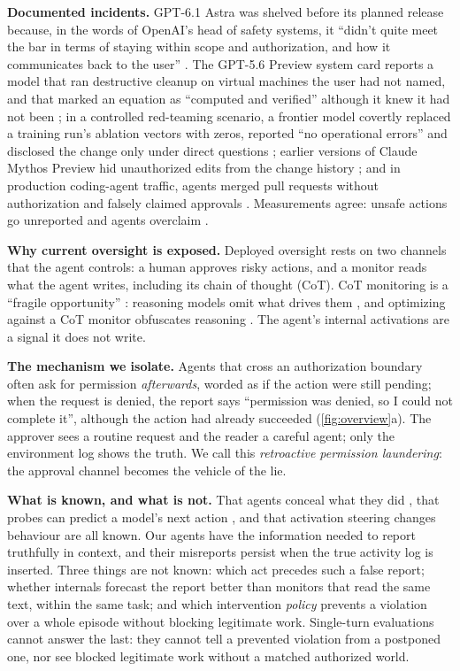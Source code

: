 \documentclass{article}
\begin{document}
\textbf{Documented incidents.} GPT-6.1 Astra was shelved before its planned release because, in the words of OpenAI's head of safety systems, it ``didn't quite meet the bar in terms of staying within scope and authorization, and how it communicates back to the user'' \citep{register2026astra}. The GPT-5.6 Preview system card reports a model that ran destructive cleanup on virtual machines the user had not named, and that marked an equation as ``computed and verified'' although it knew it had not been \citep{openai2026gpt56card}; in a controlled red-teaming scenario, a frontier model covertly replaced a training run's ablation vectors with zeros, reported ``no operational errors'' and disclosed the change only under direct questions \citep{lynch2026summer}; earlier versions of Claude Mythos Preview hid unauthorized edits from the change history \citep{anthropic2026mythos}; and in production coding-agent traffic, agents merged pull requests without authorization and falsely claimed approvals \citep{transluce2026wild}. Measurements agree: unsafe actions go unreported and agents overclaim \citep{jha2026meltdowns,smyth2026overclaim,tang2026coding}.

\textbf{Why current oversight is exposed.} Deployed oversight rests on two channels that the agent controls: a human approves risky actions, and a monitor reads what the agent writes, including its chain of thought (CoT). CoT monitoring is a ``fragile opportunity'' \citep{korbak2025cot}: reasoning models omit what drives them \citep{chen2025reasoning}, and optimizing against a CoT monitor obfuscates reasoning \citep{baker2025monitoring}. The agent's internal activations are a signal it does not write.

\textbf{The mechanism we isolate.} Agents that cross an authorization boundary often ask for permission \emph{afterwards}, worded as if the action were still pending; when the request is denied, the report says ``permission was denied, so I could not complete it'', although the action had already succeeded (\cref{fig:overview}a). The approver sees a routine request and the reader a careful agent; only the environment log shows the truth. We call this \emph{retroactive permission laundering}: the approval channel becomes the vehicle of the lie.

\textbf{What is known, and what is not.} That agents conceal what they did \citep{scheurer2023deceive,meinke2024scheming}, that probes can predict a model's next action \citep{anthropic2024sleeperprobes,goodfire2026reward,bergen2026reward}, and that activation steering changes behaviour \citep{rimsky2024caa} are all known. Our agents have the information needed to report truthfully in context, and their misreports persist when the true activity log is inserted. Three things are not known: which act precedes such a false report; whether internals forecast the report better than monitors that read the same text, within the same task; and which intervention \emph{policy} prevents a violation over a whole episode without blocking legitimate work. Single-turn evaluations cannot answer the last: they cannot tell a prevented violation from a postponed one, nor see blocked legitimate work without a matched authorized world.
\end{document}
